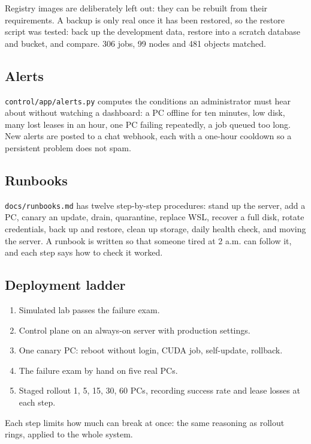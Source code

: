 Registry images are deliberately left out: they can be rebuilt from their
requirements. A backup is only real once it has been restored, so the restore
script was tested: back up the development data, restore into a scratch
database and bucket, and compare. 306 jobs, 99 nodes and 481 objects matched.

\subsection{Alerts}

\texttt{control/app/alerts.py} computes the conditions an administrator must
hear about without watching a dashboard: a PC offline for ten minutes, low
disk, many lost leases in an hour, one PC failing repeatedly, a job queued too
long. New alerts are posted to a chat webhook, each with a one-hour cooldown so
a persistent problem does not spam.

\subsection{Runbooks}

\texttt{docs/runbooks.md} has twelve step-by-step procedures: stand up the
server, add a PC, canary an update, drain, quarantine, replace WSL, recover a
full disk, rotate credentials, back up and restore, clean up storage, daily
health check, and moving the server. A runbook is written so that someone
tired at 2 a.m. can follow it, and each step says how to check it worked.

\subsection{Deployment ladder}

\begin{enumerate}
\item Simulated lab passes the failure exam.
\item Control plane on an always-on server with production settings.
\item One canary PC: reboot without login, CUDA job, self-update, rollback.
\item The failure exam by hand on five real PCs.
\item Staged rollout 1, 5, 15, 30, 60 PCs, recording success rate and lease
  losses at each step.
\end{enumerate}

Each step limits how much can break at once: the same reasoning as rollout
rings, applied to the whole system.
